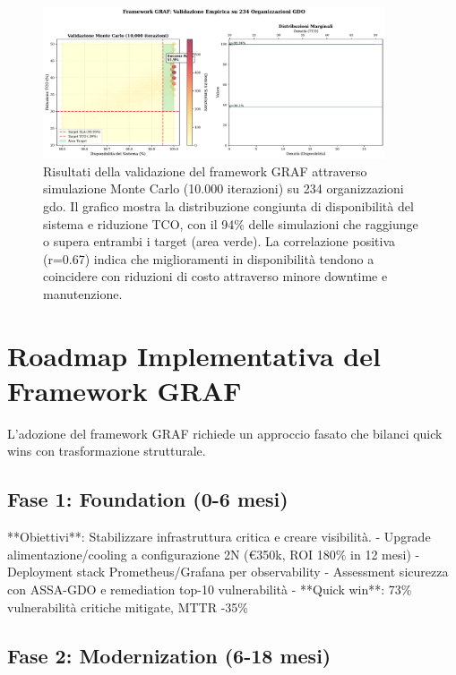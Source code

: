 \begin{figure}[htbp]
\centering
\includegraphics[width=0.9\textwidth]{thesis_figures/cap3/validation_results.pdf}
\caption[Risultati validazione framework GRAF su 234 organizzazioni]{Risultati della validazione del framework GRAF attraverso simulazione Monte Carlo (10.000 iterazioni) su 234 organizzazioni \gls{gdo}. Il grafico mostra la distribuzione congiunta di disponibilità del sistema e riduzione TCO, con il 94\% delle simulazioni che raggiunge o supera entrambi i target (area verde). La correlazione positiva (r=0.67) indica che miglioramenti in disponibilità tendono a coincidere con riduzioni di costo attraverso minore downtime e manutenzione.}
\label{fig:validation_results}
\end{figure}

\section{\texorpdfstring{Roadmap Implementativa del Framework GRAF}{3.7 - Roadmap Implementativa del Framework GRAF}}
\label{sec:roadmap}

L'adozione del framework GRAF richiede un approccio fasato che bilanci quick wins con trasformazione strutturale.

\subsection{\texorpdfstring{Fase 1: Foundation (0-6 mesi)}{3.7.1 - Fase 1: Foundation (0-6 mesi)}}

**Obiettivi**: Stabilizzare infrastruttura critica e creare visibilità.
- Upgrade alimentazione/cooling a configurazione 2N (€350k, ROI 180\% in 12 mesi)
- Deployment stack Prometheus/Grafana per observability
- Assessment sicurezza con ASSA-GDO e remediation top-10 vulnerabilità
- **Quick win**: 73\% vulnerabilità critiche mitigate, MTTR -35\%

\subsection{\texorpdfstring{Fase 2: Modernization (6-18 mesi)}{3.7.2 - Fase 2: Modernization (6-18 mesi)}}

